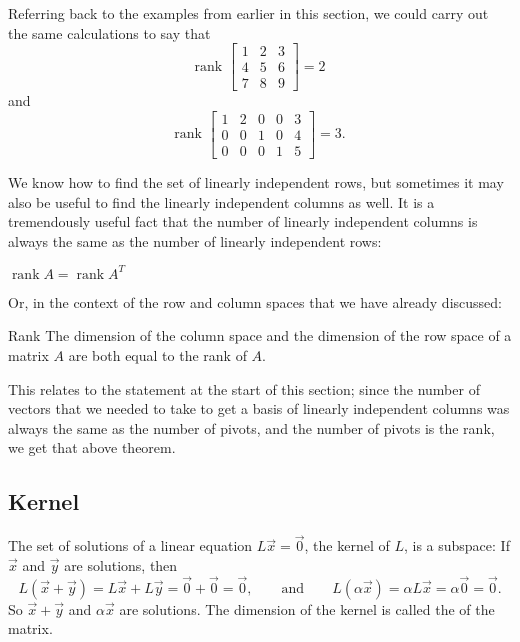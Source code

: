 Referring back to the examples from earlier in this section, we could carry out the same calculations to say that 
\begin{equation*}
\text{rank } \begin{bmatrix} 1 & 2 & 3 \\ 4 & 5 & 6 \\ 7 & 8 & 9 \end{bmatrix} = 2 
\end{equation*}
and
\begin{equation*}
\text{rank } \begin{bmatrix} 1 & 2 & 0 & 0 & 3 \\ 0 & 0 & 1 & 0 & 4 \\0 & 0 & 0 & 1 & 5 \end{bmatrix} = 3.
\end{equation*}

We know how to find the set of linearly independent rows, but sometimes it may also be useful to find the linearly independent columns as well. It is a tremendously useful fact that the number of
linearly independent
columns is always the same as the number of linearly independent rows:

\begin{theorem1}{}
$\operatorname{rank} A = \operatorname{rank} A^T$
\end{theorem1}

Or, in the context of the row and column spaces that we have already discussed:

\begin{theorem1}{Rank}
The dimension of the column space and the dimension of the row space 
of a matrix $A$ are both equal to the rank of $A$.
\end{theorem1}

This relates to the statement at the start of this section; since the number of vectors that we needed to take to get a basis of linearly independent columns was always the same as the number of pivots, and the number of pivots
is the rank, we get that above theorem.


\subsection{Kernel}

The set of solutions of a linear equation $L\vec{x} = \vec{0}$, 
the kernel of $L$, is a subspace:
If $\vec{x}$ and $\vec{y}$ are solutions,
then
\begin{equation*}
L(\vec{x}+\vec{y}) = 
L\vec{x}+L\vec{y} = 
\vec{0}+\vec{0} = \vec{0} ,
\qquad \text{and} \qquad
L(\alpha \vec{x}) = 
\alpha L \vec{x} = 
\alpha \vec{0} = \vec{0}.
\end{equation*}
So $\vec{x}+\vec{y}$ and $\alpha \vec{x}$ are solutions.
The dimension of the kernel is called the \emph{} of the
matrix.


